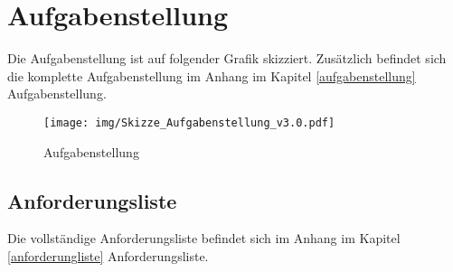 \section{Aufgabenstellung}

Die Aufgabenstellung ist auf folgender Grafik skizziert. Zusätzlich befindet sich die komplette Aufgabenstellung im Anhang im Kapitel \ref{aufgabenstellung} Aufgabenstellung.

\begin{figure}[H]
\centering
\texttt{[image: img/Skizze\_Aufgabenstellung\_v3.0.pdf]}
\caption{Aufgabenstellung}
\label{fig:aufgebanstellung}
\end{figure}

\subsection{Anforderungsliste}

Die vollständige Anforderungsliste befindet sich im Anhang im Kapitel \ref{anforderungliste} Anforderungsliste.
